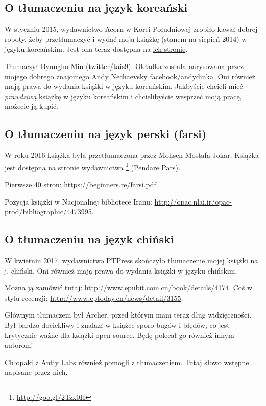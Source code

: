 



\subsection*{O tłumaczeniu na język koreański}

W styczniu 2015, wydawnictwo Acorn w Korei Południowej zrobiło kawał dobrej roboty, żeby przetłumaczyć i wydać moją książkę  (stanem na siepień 2014) w języku koreańskim.
Jest ona teraz dostępna na \href{http://go.yurichev.com/17343}{ich stronie}.

Tłumaczył Byungho Min (\href{http://go.yurichev.com/17344}{twitter/tais9}).
Okładka została narysowana przez mojego dobrego znajomego Andy Nechaevsky
\href{http://go.yurichev.com/17023}{facebook/andydinka}.
Oni również mają prawa do wydania książki w języku koreańskim.
Jakbyście chcieli mieć \emph{prawdziwą} książkę w języku koreańskim i chcielibyście wesprzeć moją pracę, możecie ją kupić.

\subsection*{O tłumaczeniu na język perski (farsi)}

W roku 2016 książka była przetłumaczona przez Mohsen Mostafa Jokar.
Książka jest dostępna na stronie wydawnictwa \footnote{\url{http://goo.gl/2Tzx0H}} (Pendare Pars).

Pierwsze 40 stron: \url{https://beginners.re/farsi.pdf}.

Pozycja książki w Nacjonalnej bibliotece Iranu: \url{http://opac.nlai.ir/opac-prod/bibliographic/4473995}.

\subsection*{O tłumaczeniu na język chiński}

W kwietniu 2017, wydawnictwo PTPress skończyło tłumaczenie mojej książki na j. chiński. Oni również mają prawa do wydania książki w języku chińskim.

Można ją zamówić tutaj: \url{http://www.epubit.com.cn/book/details/4174}. Coś w stylu recenzji: \url{http://www.cptoday.cn/news/detail/3155}.

Głównym tłumaczem był Archer, przed którym mam teraz dług widzięczności.
Był bardzo dociekliwy i znalazł w książce sporo bugów i błędów, co jest krytycznie ważne dla książki open-source.
Będę polecał go również innym autorom!

Chłopaki z \href{http://www.antiy.net/}{Antiy Labs} również pomogli z tłumaczeniem. \href{http://www.epubit.com.cn/book/onlinechapter/51413}{Tutaj słowo wstępne} napisane przez nich.



